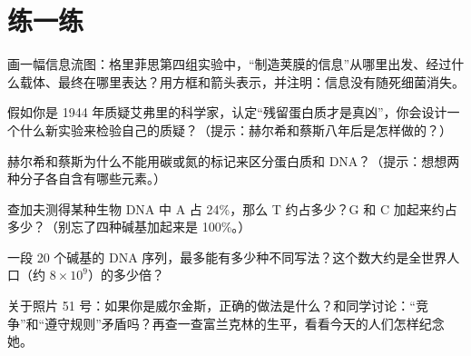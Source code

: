 \section*{练一练}

\begin{sikaoti}
\item 画一幅信息流图：格里菲思第四组实验中，“制造荚膜的信息”从哪里出发、经过什么载体、最终在哪里表达？用方框和箭头表示，并注明：信息没有随死细菌消失。
\item 假如你是 1944 年质疑艾弗里的科学家，认定“残留蛋白质才是真凶”，你会设计一个什么新实验来检验自己的质疑？（提示：赫尔希和蔡斯八年后是怎样做的？）
\item 赫尔希和蔡斯为什么不能用碳或氮的标记来区分蛋白质和 DNA？（提示：想想两种分子各自含有哪些元素。）
\item 查加夫测得某种生物 DNA 中 A 占 24\%，那么 T 约占多少？G 和 C 加起来约占多少？（别忘了四种碱基加起来是 100\%。）
\item 一段 20 个碱基的 DNA 序列，最多能有多少种不同写法？这个数大约是全世界人口（约 $8\times 10^{9}$）的多少倍？
\item 关于照片 51 号：如果你是威尔金斯，正确的做法是什么？和同学讨论：“竞争”和“遵守规则”矛盾吗？再查一查富兰克林的生平，看看今天的人们怎样纪念她。
\end{sikaoti}
